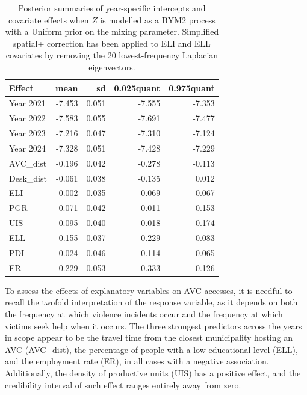 \documentclass[openany, 11pt, oneside]{book}
\begin{document}
\begin{table}[ht]
\centering
\begin{tabular}{lrrrr} %
  \hline
Effect & mean & sd & 0.025quant & 0.975quant \\ 
  \hline
  Year 2021 & -7.453 & 0.051 & -7.555 & -7.353 \\ 
  Year 2022 & -7.583 & 0.055 & -7.691 & -7.477 \\ 
  Year 2023 & -7.216 & 0.047 & -7.310 & -7.124 \\ 
  Year 2024 & -7.328 & 0.051 & -7.428 & -7.229 \\ 
  AVC\_dist & -0.196 & 0.042 & -0.278 & -0.113 \\ 
  Desk\_dist & -0.061 & 0.038 & -0.135 & 0.012 \\ 
  ELI & -0.002 & 0.035 & -0.069 & 0.067 \\ 
  PGR & 0.071 & 0.042 & -0.011 & 0.153 \\ 
  UIS & 0.095 & 0.040 & 0.018 & 0.174 \\ 
  ELL & -0.155 & 0.037 & -0.229 & -0.083 \\ 
  PDI & -0.024 & 0.046 & -0.114 & 0.065 \\ 
  ER & -0.229 & 0.053 & -0.333 & -0.126 \\  
   \hline
\end{tabular}
\captionsetup{width=0.9\textwidth}
\caption{Posterior summaries of year-specific intercepts and covariate effects when $Z$ is modelled as a BYM2 process with a Uniform prior on the mixing parameter. Simplified spatial+ correction has been applied to ELI and ELL covariates by removing the 20 lowest-frequency Laplacian eigenvectors.}
\label{tab:betapost}
\end{table}
%
To assess the effects of explanatory variables on AVC accesses, it is needful to recall the twofold interpretation of the response variable, as it depends on both the frequency at which violence incidents occur and the frequency at which victims seek help when it occurs.
%
The three strongest predictors across the years in scope appear to be the travel time from the closest municipality hosting an AVC (AVC\_dist), the percentage of people with a low educational level (ELL), and the employment rate (ER), in all cases with a negative association.
%
Additionally, the density of productive units (UIS) has a positive effect, and the credibility interval of such effect ranges entirely away from zero. 
\end{document}
